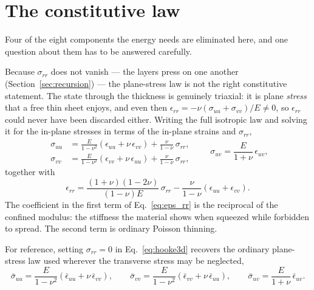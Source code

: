 \documentclass[11pt]{article}
\begin{document}
\section{The constitutive law}\label{sec:hooke3d}
Four of the eight components the energy needs are eliminated here, and one
question about them has to be answered carefully.

Because $\sigma_{rr}$ does not vanish --- the layers press on one another
(Section~\ref{sec:recursion}) --- the plane-stress law is not the right
constitutive statement. The state through the thickness is genuinely triaxial: it
is plane \emph{stress} that a free thin sheet enjoys, and even then
$\epsilon_{rr} = -\nu\left(\sigma_{uu}+\sigma_{vv}\right)/E \ne 0$, so
$\epsilon_{rr}$ could never have been discarded either. Writing the full
isotropic law and solving it for the in-plane stresses in terms of the in-plane
strains and $\sigma_{rr}$,
\begin{equation}\label{eq:hooke3d}
    \boxed{\;
    \begin{aligned}
    \sigma_{uu} &= \frac{E}{1-\nu^{2}}
      \left(\epsilon_{uu} + \nu\,\epsilon_{vv}\right)
      + \frac{\nu}{1-\nu}\,\sigma_{rr},\\
    \sigma_{vv} &= \frac{E}{1-\nu^{2}}
      \left(\epsilon_{vv} + \nu\,\epsilon_{uu}\right)
      + \frac{\nu}{1-\nu}\,\sigma_{rr},
    \end{aligned}
    \qquad
    \sigma_{uv} = \frac{E}{1+\nu}\,\epsilon_{uv},\;}
\end{equation}
together with
\begin{equation}\label{eq:eps_rr}
    \boxed{\;\epsilon_{rr} =
      \frac{\left(1+\nu\right)\left(1-2\nu\right)}{\left(1-\nu\right)E}\,
      \sigma_{rr}
      - \frac{\nu}{1-\nu}\left(\epsilon_{uu} + \epsilon_{vv}\right).\;}
\end{equation}
The coefficient in the first term of Eq.~\eqref{eq:eps_rr} is the reciprocal of
the confined modulus: the stiffness the material shows when squeezed while
forbidden to spread. The second term is ordinary Poisson thinning.


For reference, setting $\sigma_{rr} = 0$ in Eq.~\eqref{eq:hooke3d} recovers the
ordinary plane-stress law used wherever the transverse stress may be neglected,
\begin{equation}\label{eq:hooke_inv}
    \bar\sigma_{uu} = \frac{E}{1-\nu^{2}}
      \left(\bar\epsilon_{uu} + \nu\,\bar\epsilon_{vv}\right),
    \qquad
    \bar\sigma_{vv} = \frac{E}{1-\nu^{2}}
      \left(\bar\epsilon_{vv} + \nu\,\bar\epsilon_{uu}\right),
    \qquad
    \bar\sigma_{uv} = \frac{E}{1+\nu}\,\bar\epsilon_{uv}.
\end{equation}
\end{document}
